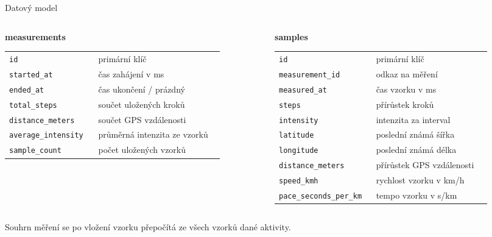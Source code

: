 \documentclass[aspectratio=169]{beamer}
\begin{document}
\begin{frame}{Datový model}
  \scriptsize
  \begin{columns}[T,onlytextwidth]
    \begin{column}{0.48\textwidth}
      \textbf{measurements}
      \vspace{0.12cm}

      \begin{tabular}{@{}p{0.39\linewidth}p{0.55\linewidth}@{}}
        \texttt{id} & primární klíč \\
        \texttt{started\_at} & čas zahájení v ms \\
        \texttt{ended\_at} & čas ukončení / prázdný \\
        \texttt{total\_steps} & součet uložených kroků \\
        \texttt{distance\_meters} & součet GPS vzdálenosti \\
        \texttt{average\_intensity} & průměrná intenzita ze vzorků \\
        \texttt{sample\_count} & počet uložených vzorků \\
      \end{tabular}
    \end{column}
    \begin{column}{0.50\textwidth}
      \textbf{samples}
      \vspace{0.12cm}

      \begin{tabular}{@{}p{0.43\linewidth}p{0.51\linewidth}@{}}
        \texttt{id} & primární klíč \\
        \texttt{measurement\_id} & odkaz na měření \\
        \texttt{measured\_at} & čas vzorku v ms \\
        \texttt{steps} & přírůstek kroků \\
        \texttt{intensity} & intenzita za interval \\
        \texttt{latitude} & poslední známá šířka \\
        \texttt{longitude} & poslední známá délka \\
        \texttt{distance\_meters} & přírůstek GPS vzdálenosti \\
        \texttt{speed\_kmh} & rychlost vzorku v km/h \\
        \texttt{pace\_seconds\_per\_km} & tempo vzorku v s/km \\
      \end{tabular}
    \end{column}
  \end{columns}
  \vspace{0.4cm}
  Souhrn měření se po vložení vzorku přepočítá ze všech vzorků dané aktivity.
\end{frame}
\end{document}
